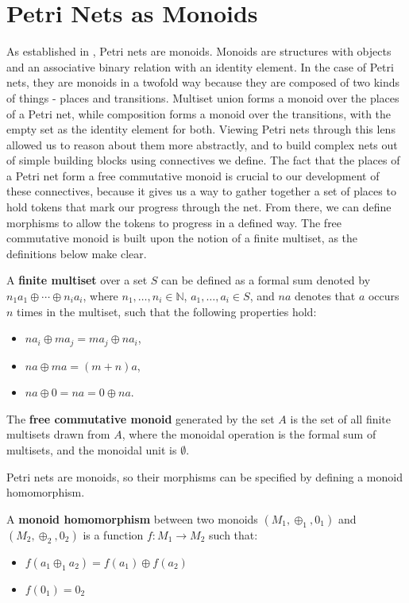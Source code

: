 \section{Petri Nets as Monoids}
As established in \cite{MESEGUER1990105}, Petri nets are monoids. Monoids are structures with objects and an associative binary relation with an identity element. In the case of Petri nets, they are monoids in a twofold way because they are composed of two kinds of things - places and transitions. Multiset union forms a monoid over the places of a Petri net, while composition forms a monoid over the transitions, with the empty set as the identity element for both. Viewing Petri nets through this lens allowed us to reason about them more abstractly, and to build complex nets out of simple building blocks using connectives we define. 
The fact that the places of a Petri net form a free commutative monoid is crucial to our development of these connectives, because it gives us a way to gather together a set of places to hold tokens that mark our progress through the net. From there, we can define morphisms to allow the tokens to progress in a defined way. The free commutative monoid is built upon the notion of a finite multiset, as the definitions below make clear. 
\begin{definition}
  \label{def:Finite-Multiset}
  A \textbf{finite multiset} over a set $S$ can be defined as a formal
  sum denoted by $n_1a_1 \oplus \cdots \oplus n_ia_i$, where $n_1,
  \ldots, n_i \in \mathbb{N}$, $a_1, \ldots, a_i \in S$, and $na$
  denotes that $a$ occurs $n$ times in the multiset, such that the
  following properties hold:
  \begin{itemize}    
  \item $na_i \oplus ma_j = ma_j \oplus na_i$,
  \item $na \oplus ma = (m+n)a$,
  \item $na \oplus 0 = na = 0 \oplus na$.
  \end{itemize}
\end{definition}
%
\begin{definition}
  \label{def:Free-Commutative-Monoid}  
  The \textbf{free commutative monoid} generated by the set $A$ is the
  set of all finite multisets drawn from $A$, where the monoidal
  operation is the formal sum of multisets, and the monoidal unit is
  $\emptyset$.
\end{definition}
Petri nets are monoids, so their morphisms can be specified by defining a monoid homomorphism.
\begin{definition}
  \label{Monoid-Homomorphism}
  A \textbf{monoid homomorphism} between two monoids $(M_1, \oplus_1, 0_1)$ and $(M_2, \oplus_2, 0_2)$
  is a function $f: M_1 \to M_2$ such that:
  \begin{itemize}
  \item $f(a_1 \oplus_1 a_2) = f(a_1) \oplus f(a_2)$
  \item $f (0_1) = 0_2$
  \end{itemize}
\end{definition}
%
